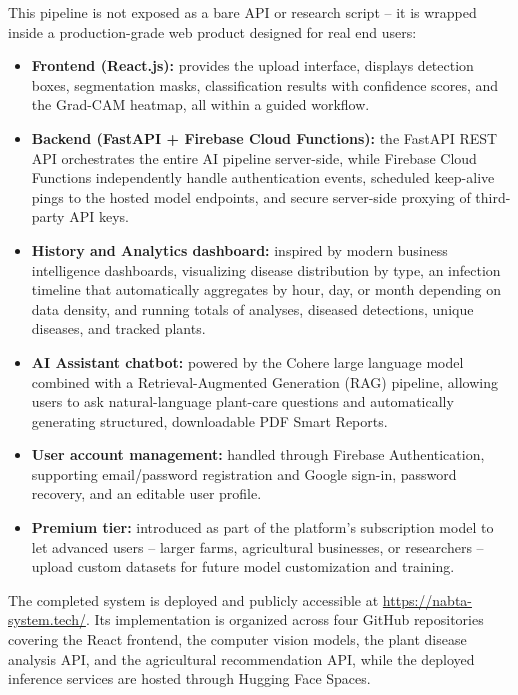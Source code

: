 This pipeline is not exposed as a bare API or research script -- it is wrapped inside a production-grade web product designed for real end users:

\begin{itemize}[leftmargin=*]
\item \textbf{Frontend (React.js):} provides the upload interface, displays detection boxes, segmentation masks, classification results with confidence scores, and the Grad-CAM heatmap, all within a guided workflow.
\item \textbf{Backend (FastAPI + Firebase Cloud Functions):} the FastAPI REST API orchestrates the entire AI pipeline server-side, while Firebase Cloud Functions independently handle authentication events, scheduled keep-alive pings to the hosted model endpoints, and secure server-side proxying of third-party API keys.
\item \textbf{History and Analytics dashboard:} inspired by modern business intelligence dashboards, visualizing disease distribution by type, an infection timeline that automatically aggregates by hour, day, or month depending on data density, and running totals of analyses, diseased detections, unique diseases, and tracked plants.
\item \textbf{AI Assistant chatbot:} powered by the Cohere large language model combined with a Retrieval-Augmented Generation (RAG) pipeline, allowing users to ask natural-language plant-care questions and automatically generating structured, downloadable PDF Smart Reports.
\item \textbf{User account management:} handled through Firebase Authentication, supporting email/password registration and Google sign-in, password recovery, and an editable user profile.
\item \textbf{Premium tier:} introduced as part of the platform's subscription model to let advanced users -- larger farms, agricultural businesses, or researchers -- upload custom datasets for future model customization and training.
\end{itemize}

The completed system is deployed and publicly accessible at \url{https://nabta-system.tech/}. Its implementation is organized across four GitHub repositories covering the React frontend, the computer vision models, the plant disease analysis API, and the agricultural recommendation API, while the deployed inference services are hosted through Hugging Face Spaces.


